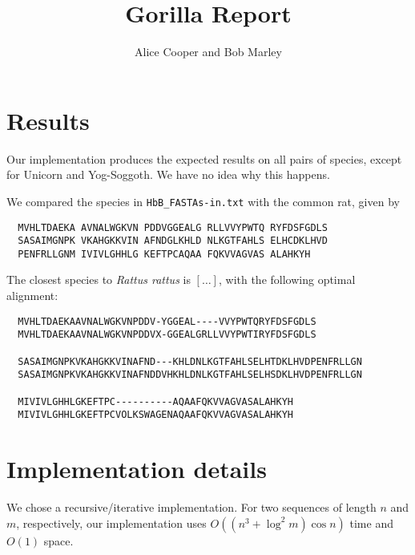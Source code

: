 \documentclass{tufte-handout}
\title{Gorilla Report}
\author{Alice Cooper and Bob Marley}
\begin{document}
  \maketitle

  \section{Results}

  Our implementation produces the expected results on all pairs of species, except for Unicorn and Yog-Soggoth.
  We have no idea why this happens.%

  We compared the species in \verb!HbB_FASTAs-in.txt!
  with the common rat, given by

  \begin{verbatim}
  MVHLTDAEKA AVNALWGKVN PDDVGGEALG RLLVVYPWTQ RYFDSFGDLS
  SASAIMGNPK VKAHGKKVIN AFNDGLKHLD NLKGTFAHLS ELHCDKLHVD
  PENFRLLGNM IVIVLGHHLG KEFTPCAQAA FQKVVAGVAS ALAHKYH
  \end{verbatim}

  The closest species to \emph{Rattus rattus} is $[\ldots]$, with the following optimal alignment:

\medskip
  \begin{fullwidth}\small
  \begin{verbatim}
  MVHLTDAEKAAVNALWGKVNPDDV-YGGEAL----VVYPWTQRYFDSFGDLS
  MVHLTDAEKAAVNALWGKVNPDDVX-GGEALGRLLVVYPWTIRYFDSFGDLS

  SASAIMGNPKVKAHGKKVINAFND---KHLDNLKGTFAHLSELHTDKLHVDPENFRLLGN
  SASAIMGNPKVKAHGKKVINAFNDDVHKHLDNLKGTFAHLSELHSDKLHVDPENFRLLGN

  MIVIVLGHHLGKEFTPC----------AQAAFQKVVAGVASALAHKYH
  MIVIVLGHHLGKEFTPCVOLKSWAGENAQAAFQKVVAGVASALAHKYH
  \end{verbatim}
\end{fullwidth}



  \section{Implementation details}

  We chose a recursive/iterative implementation.
  For two sequences of length $n$ and $m$, respectively, our implementation uses $O((n^3+\log^2 m)\cos n)$ time and
  $O(1)$ space.
\end{document}
